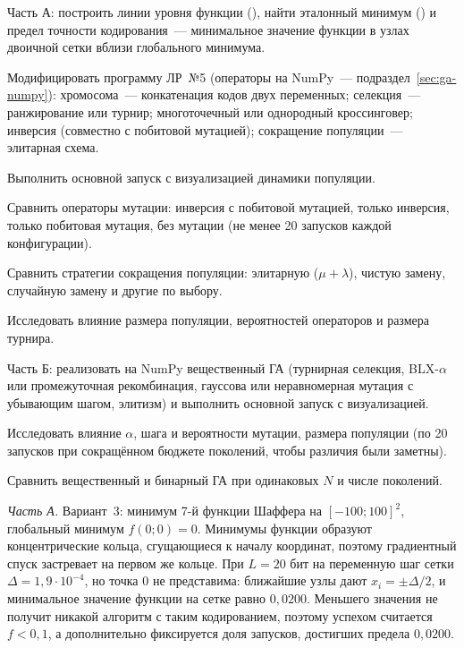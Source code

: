 \begin{steps}
\item Часть А: построить линии уровня функции (), найти эталонный минимум
() и предел точности кодирования~--- минимальное значение
функции в узлах двоичной сетки вблизи глобального минимума.
\item Модифицировать программу ЛР~№5 (операторы на NumPy~--- подраздел~\ref{sec:ga-numpy}): хромосома~---
конкатенация кодов двух переменных; селекция~---
ранжирование или турнир; многоточечный или однородный кроссинговер; инверсия (совместно с побитовой
мутацией); сокращение популяции~--- элитарная схема.
\item Выполнить основной запуск с визуализацией динамики популяции.
\item Сравнить операторы мутации: инверсия с побитовой мутацией, только инверсия, только побитовая
мутация, без мутации (не менее 20 запусков каждой конфигурации).
\item Сравнить стратегии сокращения популяции: элитарную ($\mu + \lambda$), чистую замену, случайную
замену и другие по выбору.
\item Исследовать влияние размера популяции, вероятностей операторов и размера турнира.
\item Часть Б: реализовать на NumPy вещественный ГА (турнирная селекция, BLX-$\alpha$ или
промежуточная рекомбинация, гауссова или неравномерная мутация с убывающим шагом, элитизм) и выполнить
основной запуск с визуализацией.
\item Исследовать влияние $\alpha$, шага и вероятности мутации, размера популяции (по 20 запусков при
сокращённом бюджете поколений, чтобы различия были заметны).
\item Сравнить вещественный и бинарный ГА при одинаковых $N$ и числе поколений.
\end{steps}

\emph{Часть А.} Вариант~3: минимум 7-й функции Шаффера на $[-100; 100]^2$, глобальный минимум $f(0; 0) = 0$. Минимумы
функции образуют концентрические кольца, сгущающиеся к началу координат, поэтому градиентный спуск
застревает на первом же кольце. При $L = 20$ бит на переменную шаг сетки $\Delta = 1,9 \cdot 10^{-4}$, но
точка 0 не представима: ближайшие узлы дают $x_i = \pm\Delta/2$, и минимальное значение функции на сетке
равно $0,0200$. Меньшего значения не получит никакой алгоритм с таким кодированием, поэтому успехом
считается $f < 0,1$, а дополнительно фиксируется доля запусков, достигших предела $0,0200$.


